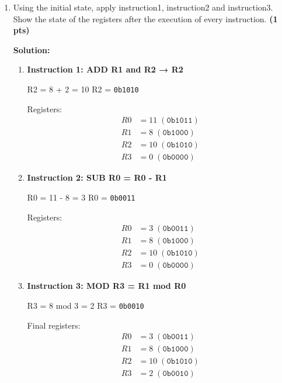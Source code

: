 \documentclass[10pt]{article}
\begin{document}
\begin{enumerate}
    \textbf{Solution:}
    \begin{itemize}
        \item Instruction 2: \texttt{0010 00 00 01}  
        Opcode 0010 = subtraction.  
        R0 = R0 - R1.
        
        \item Instruction 3: \texttt{1110 11 01 00}  
        Opcode 1110 = modulo.  
        R3 = R1 mod R0.
    \end{itemize}
    \textbf{(0.3 pts)}
    \item Using the initial state, apply instruction1, instruction2 and instruction3. Show the state
of the registers after the execution of every instruction. \textbf{(1 pts)}      

\textbf{Solution:}
\begin{enumerate}
\item \textbf{Instruction 1: ADD R1 and R2 → R2}  

R2 = 8 + 2 = 10  
R2 = \texttt{0b1010}

Registers:  
\[
\begin{aligned}
R0 &= 11\;(\texttt{0b1011})\\
R1 &= 8\;(\texttt{0b1000})\\
R2 &= 10\;(\texttt{0b1010})\\
R3 &= 0\;(\texttt{0b0000})
\end{aligned}
\]

\item \textbf{Instruction 2: SUB R0 = R0 - R1}  

R0 = 11 - 8 = 3  
R0 = \texttt{0b0011}

Registers:  
\[
\begin{aligned}
R0 &= 3\;(\texttt{0b0011})\\
R1 &= 8\;(\texttt{0b1000})\\
R2 &= 10\;(\texttt{0b1010})\\
R3 &= 0\;(\texttt{0b0000})
\end{aligned}
\]

\item \textbf{Instruction 3: MOD R3 = R1 mod R0}  

R3 = 8 mod 3 = 2  
R3 = \texttt{0b0010}

Final registers:  
\[
\begin{aligned}
R0 &= 3\;(\texttt{0b0011})\\
R1 &= 8\;(\texttt{0b1000})\\
R2 &= 10\;(\texttt{0b1010})\\
R3 &= 2\;(\texttt{0b0010})
\end{aligned}
\]
\end{enumerate}

\end{enumerate}
\end{document}
